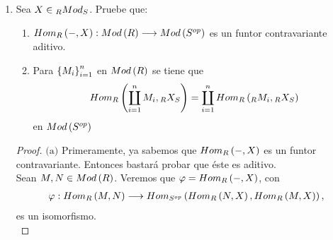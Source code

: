 \documentclass{article}
\begin{document}
\begin{enumerate}[label=\textbf{Ej \arabic*.}]
\begin{proof}
			\begin{align*}
				\functhom{A}{-}{\mathcal{A}}\lrprth{f+g}\lrprth{\alpha}&=F\lrprth{f+g}\lrprth{\alpha}\\
				&=\lrprth{f+g}\alpha=f\alpha+g\alpha\\
				&=Ff\lrprth{\alpha}+Fg\lrprth{\alpha}\\
				\implies \functhom{A}{-}{\mathcal{A}}\lrprth{f+g}&=\functhom{A}{-}{\mathcal{A}}\lrprth{f}+\functhom{A}{-}{\mathcal{A}}\lrprth{g}
			\end{align*}
			De modo que \begin{equation*}
				\functhom{A}{}{\mathcal{A}}:\functhom{B}{C}{\mathcal{A}}\to\functhom{\functhom{A}{B}{\mathcal{A}}}{\functhom{A}{C}{\mathcal{A}}}{Ab}
			\end{equation*}es un morfismo de grupos abelianos. Con lo cual, dado que $Ab$ es una categoría preaditiva (esto ya que la composición de morfismos de grupos abelianos es $\mathbb{Z}$-bilineal), se tiene que $\functhom{A}{}{\mathcal{A}}$ es un funtor aditivo.\\
			La demostración de $b)$ se realiza en forma análoga.\\
		\end{proof}
Luis envió Hoy a las 20:22
		\item Sea $X\in\ringbimod{R}{S}{Mod}{lr}$. Pruebe que:
		\begin{enumerate}
			\item $Hom_{R}\left(-,X\right): Mod\left(R\right) \longrightarrow Mod\left({S}^{op}\right)$ es un funtor contravariante aditivo.
			\item Para ${\left\{{M}_{i}\right\}}_{i=1}^{n}$ en $Mod\left(R\right)$ se tiene que
			\begin{align*}
				\ringmodhom{R}{\displaystyle\coprod_{i=1}^{n}M_{i}}{\ringbimod{R}{S}{X}{lr}}=\displaystyle\coprod_{i=1}^{n}\ringmodhom{R}{\ringmod{R}{M_{i}}{l}}{\ringbimod{R}{S}{X}{lr}}
			\end{align*}
			en $Mod\left({S}^{op}\right)$
		\end{enumerate}
		\begin{proof}
			$\boxed{\text{(a)}}$ Primeramente, ya sabemos que $Hom_{R}\left(-,X\right)$ es un funtor contravariante. Entonces bastará probar que éste es aditivo.\\
			
			Sean $M,N \in Mod\left(R\right)$. Veremos que $\varphi=Hom_{R}\left(-,X\right)$, con
			\begin{align*}
				\varphi:Hom_{R}\left(M,N\right)\longrightarrow Hom_{{S}^{op}}\left(Hom_{R}\left(N,X\right),Hom_{R}\left(M,X\right)\right),
			\end{align*}
			es un isomorfismo.\\
			

\end{proof}
\end{enumerate}
\end{document}
